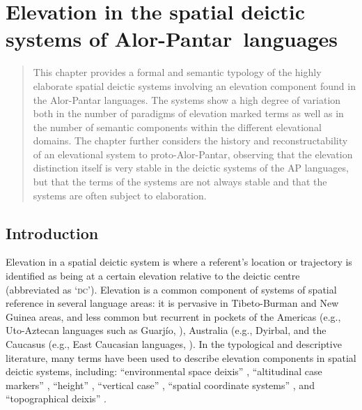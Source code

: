 

\chapter{Elevation in the spatial deictic systems of Alor-Pantar~languages}

\begin{abstract}
This chapter provides a formal and semantic typology of the highly elaborate spatial deictic systems involving an elevation component found in the Alor-Pantar languages. The systems show a high degree of variation both in the number of paradigms of elevation marked terms as well as in the number of semantic components within the different elevational domains. The chapter further considers the history and reconstructability of an elevational system to proto-Alor-Pantar, observing that the elevation distinction itself is very stable in the deictic systems of the AP languages, but that the terms of the systems are not always stable and that the systems are often subject to elaboration.
\end{abstract}


\section{Introduction} 


Elevation in a spatial deictic system is where a referent's location or trajectory is identified as being at a certain elevation relative to the deictic centre (abbreviated as `\textsc{dc}'). Elevation is a common component of systems of spatial reference in several language areas: it is pervasive in Tibeto-Burman \citep{Bickel2001,Cheung2007,Post2011} and New Guinea \citep{Senft1997,Senft2004,Diessel1999,Levinson1983} areas, and less common but recurrent in pockets of the Americas (e.g., Uto-Aztecan languages such as Guarj\'io, \citet{Miller1996}), Australia (e.g., Dyirbal, \citealt[48]{Dixon1972} and the Caucasus (e.g., East Caucasian languages, \citet{Schulze2003}). In the typological and descriptive literature, many terms have been used to describe elevation components in spatial deictic systems, including: ``environmental space deixis'' \citep{Bickel2001}, ``altitudinal case markers'' \citep{Ebert2003}, ``height'' \citep{Dixon2003}, ``vertical case'' \citep{Noonan2006}, ``spatial coordinate systems'' \citep{Burenhult2008}, and ``topographical deixis'' \citep{Post2011}. 

